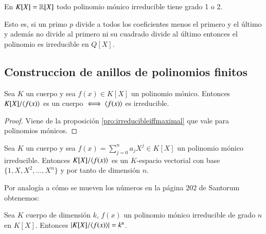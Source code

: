 \begin{obs}
	En $K[X] = \mathbb{R}[X]$ todo polinomio mónico irreducible tiene grado 1 o 2.
\end{obs}

Esto es, si un primo $p$ divide a todos los coeficientes menos el primero y el último y además no divide al primero ni su cuadrado divide al último entonces el polinomio es irreducible en $Q[X]$.


\subsection{Construccion de anillos de polinomios finitos}

\begin{pro}
	Sea $K$ un cuerpo y sea $f(x) \in K[X]$ un polinomio mónico. Entonces $K[X]/\langle f(x)\rangle$ es un cuerpo $\iff \langle f(x)\rangle$ es irreducible.
\end{pro}

\begin{proof}
	Viene de la proposición \autoref{pro:irreducibleiffmaximal} que vale para polinomios mónicos.
\end{proof}

\begin{thm}
	Sea $K$ un cuerpo y sea $f(x) = \sum_{j=0}^n a_j X^j \in K[X]$ un polinomio mónico irreducible. Entonces $K[X] / \langle f(x)\rangle$ es un $K$-espacio vectorial con base $\{1, X, X^2, \dots, X^n\}$ y por tanto de dimensión $n$.
\end{thm}

Por analogía a cómo se mueven los números en la página 202 de Santorum obtenemos:

\begin{pro}
	Sea $K$ cuerpo de dimensión $k$, $f(x)$ un polinomio mónico irreducible de grado $n$ en $K[X]$. Entonces $|K[X]/\langle f(x)\rangle| = k^n$.
\end{pro}

